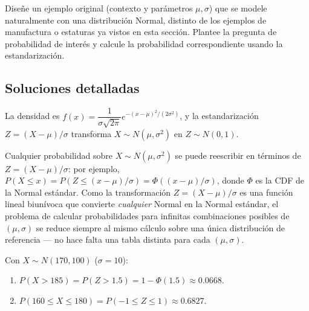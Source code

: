 \begin{problema}
	\label{prob:1c4fda2}
	Diseñe un ejemplo original (contexto y parámetros $\mu,\sigma$) que se modele naturalmente con una distribución Normal, distinto de los ejemplos de manufactura o estaturas ya vistos en esta sección. Plantee la pregunta de probabilidad de interés y calcule la probabilidad correspondiente usando la estandarización.
\end{problema}

\subsection*{Soluciones detalladas}

\begin{solproblema}[prob:6f58870]
	La densidad es $f(x) = \dfrac{1}{\sigma\sqrt{2\pi}}e^{-(x-\mu)^2/(2\sigma^2)}$, y la estandarización $Z=(X-\mu)/\sigma$ transforma $X\sim N(\mu,\sigma^2)$ en $Z\sim N(0,1)$.
\end{solproblema}

\begin{solproblema}[prob:74e7285]
	Cualquier probabilidad sobre $X\sim N(\mu,\sigma^2)$ se puede reescribir en términos de $Z=(X-\mu)/\sigma$: por ejemplo, $P(X\le x) = P(Z \le (x-\mu)/\sigma) = \Phi((x-\mu)/\sigma)$, donde $\Phi$ es la CDF de la Normal estándar. Como la transformación $Z=(X-\mu)/\sigma$ es una función lineal biunívoca que convierte \emph{cualquier} Normal en la Normal estándar, el problema de calcular probabilidades para infinitas combinaciones posibles de $(\mu,\sigma)$ se reduce siempre al mismo cálculo sobre una única distribución de referencia — no hace falta una tabla distinta para cada $(\mu,\sigma)$.
\end{solproblema}

\begin{solproblema}[prob:48f2103]
	Con $X\sim N(170,100)$ ($\sigma=10$):
	\begin{enumerate}
		\item $P(X>185) = P(Z>1.5) = 1-\Phi(1.5) \approx 0.0668$.
		\item $P(160\le X\le180) = P(-1\le Z\le1) \approx 0.6827$.
	\end{enumerate}
\end{solproblema}

